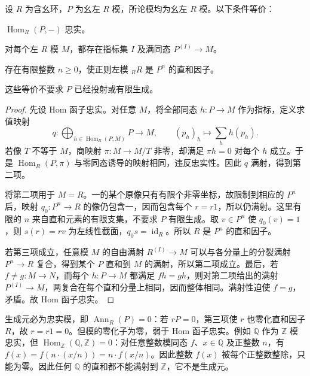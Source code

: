 \begin{theorem}[生成元的等价刻画]\label{b2:thm:generator-characterizations}
	设 \(R\) 为含幺环，\(P\) 为幺左 \(R\) 模，所论模均为幺左 \(R\) 模。以下条件等价：
	\begin{equivalences}
		\item\label{b2:item:generator-faithful} \(\operatorname{Hom}_R(P,-)\) 忠实。
		\item\label{b2:item:generator-quotients} 对每个左 \(R\) 模 \(M\)，都存在指标集 \(I\) 及满同态 \(P^{(I)}\rightarrow M\)。
		\item\label{b2:item:generator-finite-summand} 存在有限整数 \(n\geq0\)，使正则左模 \({}_RR\) 是 \(P^n\) 的直和因子。
	\end{equivalences}
	这些等价不要求 \(P\) 已经投射或有限生成。
\end{theorem}
\begin{proof}
	先设 Hom 函子忠实。对任意 \(M\)，将全部同态 \(h:P\rightarrow M\) 作为指标，定义求值映射
	\[
		q:\bigoplus_{h\in\operatorname{Hom}_R(P,M)}P\longrightarrow M, \qquad (p_h)_h\longmapsto\sum_h h(p_h).
	\]
	若像 \(T\) 不等于 \(M\)，商映射 \(\pi:M\rightarrow M/T\) 非零，却满足 \(\pi h=0\) 对每个 \(h\) 成立。于是 \(\operatorname{Hom}_R(P,\pi)\) 与零同态诱导的映射相同，违反忠实性。因此 \(q\) 满射，得到第二项。

	将第二项用于 \(M=R\)。一的某个原像只有有限个非零坐标，故限制到相应的 \(P^n\) 后，映射 \(q_0:P^n\rightarrow R\) 的像仍包含一，因而包含每个 \(r=r1\)，所以仍满射。这里有限的 \(n\) 来自直和元素的有限支集，不要求 \(P\) 有限生成。取 \(v\in P^n\) 使 \(q_0(v)=1\)，则 \(s(r)=rv\) 为左线性截面，\(q_0s=\operatorname{id}_R\)。所以 \(R\) 是 \(P^n\) 的直和因子。

	若第三项成立，任意模 \(M\) 的自由满射 \(R^{(I)}\rightarrow M\) 可以与各分量上的分裂满射 \(P^n\rightarrow R\) 复合，得到某个 \(P\) 直和到 \(M\) 的满射，所以第二项成立。最后，若 \(f\ne g:M\rightarrow N\)，而每个 \(h:P\rightarrow M\) 都满足 \(fh=gh\)，则对第二项给出的满射 \(P^{(I)}\rightarrow M\)，两复合在每个直和分量上相同，因而整体相同。满射性迫使 \(f=g\)，矛盾。故 Hom 函子忠实。
\end{proof}

生成元必为忠实模，即 \(\operatorname{Ann}_R(P)=0\)：若 \(rP=0\)，第三项使 \(r\) 也零化直和因子 \(R\)，故 \(r=r1=0\)。但模的零化子为零，弱于 Hom 函子忠实。例如 \(\mathbb Q\) 作为 \(\mathbb Z\) 模忠实，但 \(\operatorname{Hom}_{\mathbb Z}(\mathbb Q,\mathbb Z)=0\)：对任意整数模同态 \(f\)、\(x\in\mathbb Q\) 及正整数 \(n\)，有 \(f(x)=f(n\cdot(x/n))=n\cdot f(x/n)\)。因此整数 \(f(x)\) 被每个正整数整除，只能为零。因此任何 \(\mathbb Q\) 的直和都不能满射到 \(\mathbb Z\)，它不是生成元。

